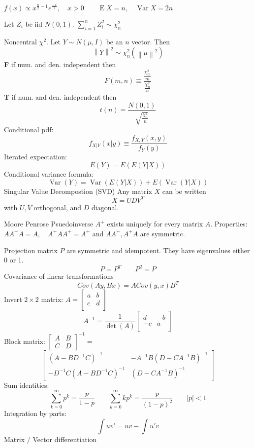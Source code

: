 \documentclass[10pt, twocolumn]{article}
\newcommand{\norm}[1]{\left\lVert#1\right\rVert}
\newcommand{\Expect}{\operatorname{E}}
\newcommand{\Var}{\operatorname{Var}}
\begin{document}
$
f(x) \propto x^{\frac{n}{2} - 1} e^{\frac{-x}{2}},
\quad x > 0
\qquad \Expect X = n,
\quad \Var X = 2n
$

Let $Z_i$ be iid $N(0, 1)$.
$\sum_{i=1}^n Z_i^2 \sim \chi^2_n$

Noncentral $\chi^2$. Let $Y \sim N(\mu, I)$ be an $n$ vector. Then 
\[
    \norm{Y}^2 \sim \chi^2_n(\norm{\mu}^2)
\]
\textbf{F} if num. and den. independent then
\[
    F(m, n) \equiv \frac{\frac{\chi^2_m}{m}}
        {\frac{\chi^2_n}{n}}
\]
\textbf{T} if num. and den. independent then
\[
    t(n) = \frac{N(0, 1)}
    {\sqrt{\frac{\chi^2_n}{n}}}
\]
Conditional pdf:
\[
    f_{X|Y}(x | y) \equiv \frac{f_{X, Y}(x, y)}{f_Y(y)}
\]
Iterated expectation:
\[
    E(Y) = E(E(Y | X))
\]
Conditional variance formula:
\[
    \Var(Y) = \Var(E(Y | X)) + E(\Var(Y | X))
\]
Singular Value Decompostion (SVD) Any matrix $X$ can be written
\[
    X = UDV^T
\]
with $U, V$ orthogonal, and $D$ diagonal.

Moore Penrose Psuedoinverse $A^+$ exists uniquely for every matrix $A$.
Properties: $AA^+A = A, \quad A^+AA^+ = A^+$ and $AA^+, A^+A$ are symmetric.

Projection matrix $P$ are symmetric and idempotent. They have eigenvalues
either 0 or 1.
\[
    P = P^T \qquad P^2 = P
\]
Covariance of linear transformations
\[
    Cov(Ay, Bx) = A Cov(y, x) B^T
\]
Invert $2 \times 2$ matrix:
$
    A = 
    [\begin{smallmatrix}
        a & b \\
        c & d \\
    \end{smallmatrix}]
$
\[
    A^{-1} = 
    \frac{1}{\det (A)}
    \begin{bmatrix}
        d & -b \\
        -c & a \\
    \end{bmatrix}
\]
Block matrix:
$
\begin{bmatrix}
    A & B \\
    C & D
\end{bmatrix}^{-1} =
$
\[
\begin{bmatrix}
                     (A - BD^{-1}C)^{-1}         & -A^{-1}B(D -
    CA^{-1}B)^{-1} \\
                     -D^{-1}C(A - BD^{-1}C)^{-1} & (D - CA^{-1}B)^{-1}  
\end{bmatrix}
\]
Sum identities:
\[
    \sum_{k=0}^{\infty} p^k = \frac{p}{1 - p} \qquad 
    \sum_{k=0}^{\infty} k p^k = \frac{p}{(1 - p)^2} \qquad |p| < 1
\]
Integration by parts:
\[
    \int uv' = uv - \int u'v
\]
Matrix / Vector differentiation
\end{document}
